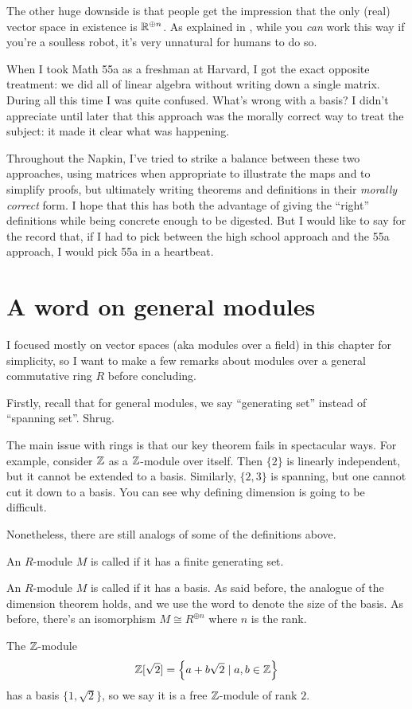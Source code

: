 The other huge downside is that people get the impression
that the only (real) vector space in existence is $\mathbb R^{\oplus n}$.
As explained in ,
while you \emph{can} work this way if you're a soulless robot,
it's very unnatural for humans to do so.

When I took Math 55a as a freshman at Harvard,
I got the exact opposite treatment:
we did all of linear algebra without writing down a single matrix.
During all this time I was quite confused.
What's wrong with a basis?
I didn't appreciate until later that this approach was the
morally correct way to treat the subject: it made it clear what was happening.

Throughout the Napkin, I've tried to strike a balance between these
two approaches, using matrices when appropriate to illustrate
the maps and to simplify proofs, but ultimately writing
theorems and definitions in their \emph{morally correct} form.
I hope that this has both the advantage of giving the ``right'' definitions
while being concrete enough to be digested.
But I would like to say for the record that,
if I had to pick between the high school approach and the 55a approach,
I would pick 55a in a heartbeat.

\section{A word on general modules}
I focused mostly on vector spaces (aka modules over a field) in this chapter
for simplicity, so I want to make a few remarks about
modules over a general commutative ring $R$ before concluding.

Firstly, recall that for general modules,
we say ``generating set'' instead of ``spanning set''.
Shrug.

The main issue with rings is that our key theorem 
fails in spectacular ways.
For example, consider $\mathbb Z$ as a $\mathbb Z$-module over itself.
Then $\{2\}$ is linearly independent, but it cannot be extended to a basis.
Similarly, $\{2,3\}$ is spanning, but one cannot cut it down to a basis.
You can see why defining dimension is going to be difficult.

Nonetheless, there are still analogs of some of the definitions above.
\begin{definition}
	An $R$-module $M$ is called  if it has a finite generating set.
\end{definition}
\begin{definition}
	An $R$-module $M$ is called  if it has a basis.
	As said before, the analogue of the dimension theorem holds,
	and we use the word  to denote the size of the basis.
	As before, there's an isomorphism $M \cong R^{\oplus n}$ where $n$ is the rank.
\end{definition}
\begin{example}
	The $\mathbb Z$-module
	\[ \mathbb Z[\sqrt2] = \left\{ a + b\sqrt 2 \mid a,b \in \mathbb Z \right\} \]
	has a basis $\{1, \sqrt 2\}$, so we say it is
	a free $\mathbb Z$-module of rank $2$.
\end{example}

